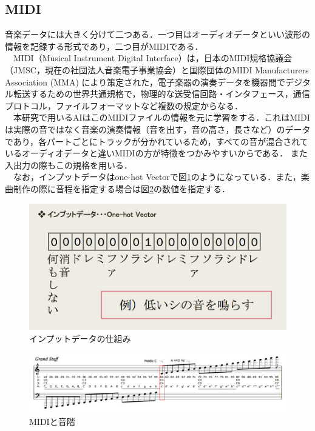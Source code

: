 \subsection{MIDI}
音楽データには大きく分けて二つある．一つ目はオーディオデータといい波形の情報を記録する形式であり，二つ目がMIDIである．\\
　MIDI（Musical Instrument Digital Interface）は，日本のMIDI規格協議会（JMSC，現在の社団法人音楽電子事業協会）と国際団体のMIDI Manufacturers Association (MMA) により策定された，電子楽器の演奏データを機器間でデジタル転送するための世界共通規格で，物理的な送受信回路・インタフェース，通信プロトコル，ファイルフォーマットなど複数の規定からなる．\\
　本研究で用いるAIはこのMIDIファイルの情報を元に学習をする．これはMIDIは実際の音ではなく音楽の演奏情報（音を出す，音の高さ，長さなど）のデータであり，各パートごとにトラックが分かれているため，すべての音が混合されているオーディオデータと違いMIDIの方が特徴をつかみやすいからである．
また入出力の際もこの規格を用いる．\\
　なお，インプットデータはone-hot Vectorで図\ref{fig:インプットデータの仕組み}のようになっている．また，楽曲制作の際に音程を指定する場合は図\ref{fig:MIDIと音階}の数値を指定する．
\begin{figure}[h]
    \begin{screen}
    \begin{center}
        \includegraphics[scale=0.85,clip]{./img/midi1.png}
        \caption{インプットデータの仕組み}
        \label{fig:インプットデータの仕組み}
    \end{center}
    \end{screen}
\end{figure}
\newpage
\begin{figure}[h]
    \begin{screen}
    \begin{center}
        \includegraphics[scale=0.45,clip]{./img/midi2.png}
        \caption{MIDIと音階}
        \label{fig:MIDIと音階}
    \end{center}
    \end{screen}
\end{figure}
\newpage
